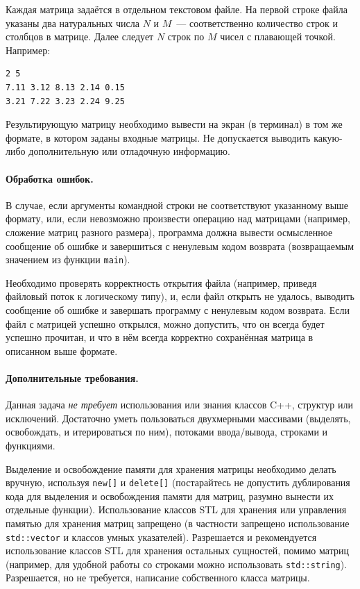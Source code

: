 \documentclass[a4paper,10pt]{article}
\begin{document}
Каждая матрица задаётся в отдельном текстовом файле.
На первой строке файла указаны два натуральных числа $N$ и $M$~---
соответственно количество строк и столбцов в матрице.
Далее следует $N$ строк по $M$ чисел с плавающей точкой.
Например:
\begin{Verbatim}[frame=single]
2 5
7.11 3.12 8.13 2.14 0.15
3.21 7.22 3.23 2.24 9.25
\end{Verbatim}

Результирующую матрицу необходимо вывести на экран (в терминал) в том же формате, в котором заданы входные матрицы.
Не допускается выводить какую-либо дополнительную или отладочную информацию.

\paragraph{Обработка ошибок.}

В случае, если аргументы командной строки не соответствуют указанному выше формату, или, если невозможно произвести операцию над матрицами
(например, сложение матриц разного размера),
программа должна вывести осмысленное сообщение об ошибке и завершиться с ненулевым кодом возврата (возвращаемым значением из функции {\tt main}).

Необходимо проверять корректность открытия файла (например, приведя файловый поток к логическому типу), и, если файл открыть не удалось, выводить сообщение об ошибке и завершать программу с ненулевым кодом возврата.
Если файл с матрицей успешно открылся, можно допустить, что он всегда будет успешно прочитан, и что в нём всегда корректно сохранённая матрица в описанном выше формате.

\paragraph{Дополнительные требования.}
Данная задача {\em не требует} использования или знания классов C++, структур или исключений.
Достаточно уметь пользоваться двухмерными массивами (выделять, освобождать, и итерироваться по ним), потоками ввода/вывода, строками и функциями.

Выделение и освобождение памяти для хранения матрицы необходимо делать вручную, используя {\tt new[]} и {\tt delete[]} (постарайтесь не допустить дублирования кода для выделения и освобождения памяти для матриц, разумно вынести их отдельные функции).
Использование классов STL для хранения или управления памятью для хранения матриц запрещено
(в частности запрещено использование {\tt std::vector} и
классов умных указателей).
Разрешается и рекомендуется использование классов STL для хранения остальных сущностей, помимо матриц (например, для удобной работы со строками можно использовать {\tt std::string}).
Разрешается, но не требуется, написание собственного класса матрицы.
\end{document}
